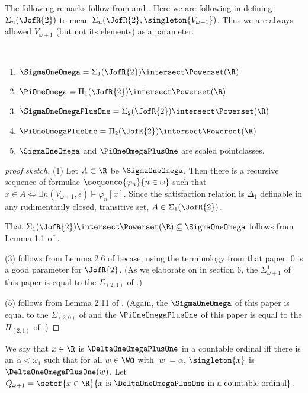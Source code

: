 \documentclass[oneside,12pt]{amsart}
\begin{document}
The following remarks follow from \cite{Scales_In_LofR} and \cite{Mouse_Sets}.
Here we are following \cite{Scales_In_LofR} in defining $\Sigma_n(\JofR{2})$ to 
mean $\Sigma_n(\JofR{2},\singleton{V_{\omega+1}})$. Thus we are always allowed $V_{\omega+1}$
(but not its elements) as a parameter.
\begin{remarks} \
\begin{enumerate}
\item$\SigmaOneOmega = \Sigma_1(\JofR{2}) \intersect \Powerset(\R)$
\item $\PiOneOmega = \Pi_1(\JofR{2}) \intersect \Powerset(\R)$
\item $\SigmaOneOmegaPlusOne = \Sigma_2(\JofR{2}) \intersect \Powerset(\R)$
\item $\PiOneOmegaPlusOne = \Pi_2(\JofR{2}) \intersect \Powerset(\R)$
\item $\SigmaOneOmega$ and $\PiOneOmegaPlusOne$ are scaled pointclasses.
\end{enumerate}
\end{remarks}
\begin{proof}[proof sketch]
(1) Let $A\subset\R$ be $\SigmaOneOmega$. Then there is a recursive sequence of formulae $\sequence{\varphi_n}{n\in\omega}$
such that $x\in A \iff \exists n (V_{\omega+1},\epsilon)\models \varphi_n[x]$.
Since the satisfaction relation is $\Delta_1$ definable in any rudimentarily closed, transitive set,
$A\in \Sigma_1(\JofR{2})$.

That $\Sigma_1(\JofR{2}) \intersect \Powerset(\R) \subseteq \SigmaOneOmega$ follows from Lemma 1.1 of \cite{Mouse_Sets}.

(3) follows from Lemma 2.6 of \cite{Mouse_Sets} becase, using the terminology from that paper, $0$ is a good parameter
for $\JofR{2}$. (As we elaborate on in section 6, the
$\Sigma^1_{\omega+1}$ of this paper is
equal to the $\Sigma_{(2,1)}$ of \cite{Mouse_Sets}.)

(5) follows from Lemma 2.11 of \cite{Mouse_Sets}. (Again, the $\SigmaOneOmega$
of this paper is equal to the $\Sigma_{(2,0)}$ of \cite{Mouse_Sets} and
the $\PiOneOmegaPlusOne$ of this paper is equal to the $\Pi_{(2,1)}$ of \cite{Mouse_Sets}.)
\end{proof}


\begin{definition}
We say that $x\in\R$ is $\DeltaOneOmegaPlusOne$ in a countable ordinal iff there is an $\alpha<\omega_1$ such
that for all $w\in\WO$ with $|w|=\alpha$, $\singleton{x}$ is $\DeltaOneOmegaPlusOne(w)$.
Let $Q_{\omega+1} = \setof{x\in\R}{x\text{ is }\DeltaOneOmegaPlusOne\text{ in a countable ordinal}}$.
\end{definition}
\end{document}
